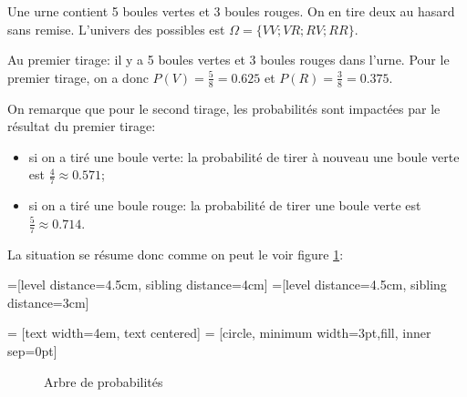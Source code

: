 \documentclass[a4paper,12pt]{scrartcl}
\begin{document}
Une urne contient 5 boules vertes et 3 boules rouges. On en tire deux au hasard sans remise. L'univers des possibles est $\Omega = \{ VV;VR;RV;RR \}$.

Au premier tirage: il y a 5 boules vertes et 3 boules rouges dans l'urne. Pour le premier tirage, on a donc $P(V) = \frac{5}{8} = 0.625$ et $P(R) = \frac{3}{8} = 0.375$.

On remarque que pour le second tirage, les probabilités sont impactées par le résultat du premier tirage:

\begin{itemize}
 \item si on a tiré une boule verte: la probabilité de tirer à nouveau une boule verte est $\frac{4}{7} \approx 0.571$;
 \item si on a tiré une boule rouge: la probabilité de tirer une boule verte est $\frac{5}{7} \approx 0.714$.
\end{itemize}

La situation se résume donc comme on peut le voir figure \ref{fig:arbre}: 

=[level distance=4.5cm, sibling distance=4cm]
=[level distance=4.5cm, sibling distance=3cm]

 = [text width=4em, text centered]
 = [circle, minimum width=3pt,fill, inner sep=0pt]


\begin{figure}
    \centering
{}
\caption{Arbre de probabilités}
\label{fig:arbre}
\end{figure}
\end{document}
